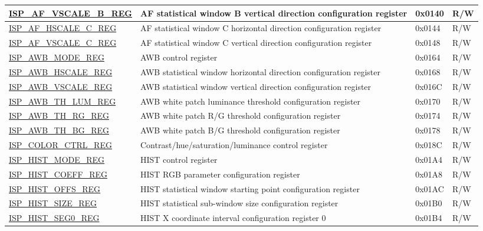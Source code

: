 \begin{longtable}{ | p{6cm} | p{7.2cm} | p{1.3cm} | p{1cm} | }
\hyperref[regdesc:ISPAFVSCALEBREG]{ISP\_AF\_VSCALE\_B\_REG} & AF statistical window B vertical direction configuration register & 0x0140 & R/W \\ \hline
\hyperref[regdesc:ISPAFHSCALECREG]{ISP\_AF\_HSCALE\_C\_REG} & AF statistical window C horizontal direction configuration register & 0x0144 & R/W \\ \hline
\hyperref[regdesc:ISPAFVSCALECREG]{ISP\_AF\_VSCALE\_C\_REG} & AF statistical window C vertical direction configuration register & 0x0148 & R/W \\ \hline
\hyperref[regdesc:ISPAWBMODEREG]{ISP\_AWB\_MODE\_REG} & AWB control register & 0x0164 & R/W \\ \hline
\hyperref[regdesc:ISPAWBHSCALEREG]{ISP\_AWB\_HSCALE\_REG} & AWB statistical window horizontal direction configuration register & 0x0168 & R/W \\ \hline
\hyperref[regdesc:ISPAWBVSCALEREG]{ISP\_AWB\_VSCALE\_REG} & AWB statistical window vertical direction configuration register & 0x016C & R/W \\ \hline
\hyperref[regdesc:ISPAWBTHLUMREG]{ISP\_AWB\_TH\_LUM\_REG} & AWB white patch luminance threshold configuration register & 0x0170 & R/W \\ \hline
\hyperref[regdesc:ISPAWBTHRGREG]{ISP\_AWB\_TH\_RG\_REG} & AWB white patch R/G threshold configuration register & 0x0174 & R/W \\ \hline
\hyperref[regdesc:ISPAWBTHBGREG]{ISP\_AWB\_TH\_BG\_REG} & AWB white patch B/G threshold configuration register & 0x0178 & R/W \\ \hline
\hyperref[regdesc:ISPCOLORCTRLREG]{ISP\_COLOR\_CTRL\_REG} & Contrast/hue/saturation/luminance control register & 0x018C & R/W \\ \hline
\hyperref[regdesc:ISPHISTMODEREG]{ISP\_HIST\_MODE\_REG} & HIST control register & 0x01A4 & R/W \\ \hline
\hyperref[regdesc:ISPHISTCOEFFREG]{ISP\_HIST\_COEFF\_REG} & HIST RGB parameter configuration register & 0x01A8 & R/W \\ \hline
\hyperref[regdesc:ISPHISTOFFSREG]{ISP\_HIST\_OFFS\_REG} & HIST statistical window starting point configuration register & 0x01AC & R/W \\ \hline
\hyperref[regdesc:ISPHISTSIZEREG]{ISP\_HIST\_SIZE\_REG} & HIST statistical sub-window size configuration register & 0x01B0 & R/W \\ \hline
\hyperref[regdesc:ISPHISTSEG0REG]{ISP\_HIST\_SEG0\_REG} & HIST X coordinate interval configuration register 0 & 0x01B4 & R/W \\ \hline

\end{longtable}
